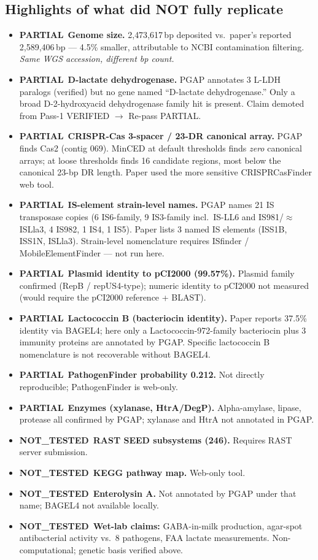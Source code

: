 \documentclass[11pt,letterpaper]{article}
\newcommand{\partialv}{\textcolor{orange!85!black}{\textbf{PARTIAL}}}
\newcommand{\nottested}{\textcolor{gray!70!black}{\textbf{NOT\_TESTED}}}
\begin{document}
\subsection{Highlights of what did NOT fully replicate}
\begin{itemize}[leftmargin=1.4em]
\item \partialv\ \textbf{Genome size.} 2{,}473{,}617\,bp deposited
vs.\ paper's reported 2{,}589{,}406\,bp --- 4.5\% smaller, attributable
to NCBI contamination filtering. \emph{Same WGS accession, different bp count.}
\item \partialv\ \textbf{D-lactate dehydrogenase.} PGAP annotates
3 L-LDH paralogs (verified) but no gene named ``D-lactate dehydrogenase.''
Only a broad D-2-hydroxyacid dehydrogenase family hit is present.
Claim demoted from Pass-1 VERIFIED $\rightarrow$ Re-pass PARTIAL.
\item \partialv\ \textbf{CRISPR-Cas 3-spacer / 23-DR canonical array.}
PGAP finds Cas2 (contig 069). MinCED at default thresholds finds
\emph{zero} canonical arrays; at loose thresholds finds 16 candidate
regions, most below the canonical 23-bp DR length. Paper used the more
sensitive CRISPRCasFinder web tool.
\item \partialv\ \textbf{IS-element strain-level names.} PGAP names
21 IS transposase copies (6 IS6-family, 9 IS3-family incl.\ IS-LL6 and
IS981/$\approx$ISLla3, 4 IS982, 1 IS4, 1 IS5). Paper lists 3 named
IS elements (ISS1B, ISS1N, ISLla3). Strain-level nomenclature requires
ISfinder / MobileElementFinder --- not run here.
\item \partialv\ \textbf{Plasmid identity to pCI2000 (99.57\%).}
Plasmid family confirmed (RepB / repUS4-type); numeric identity to
pCI2000 not measured (would require the pCI2000 reference + BLAST).
\item \partialv\ \textbf{Lactococcin B (bacteriocin identity).}
Paper reports 37.5\% identity via BAGEL4; here only a
Lactococcin-972-family bacteriocin plus 3 immunity proteins are
annotated by PGAP. Specific lactococcin B nomenclature is not
recoverable without BAGEL4.
\item \partialv\ \textbf{PathogenFinder probability 0.212.}
Not directly reproducible; PathogenFinder is web-only.
\item \partialv\ \textbf{Enzymes (xylanase, HtrA/DegP).}
Alpha-amylase, lipase, protease all confirmed by PGAP;
xylanase and HtrA not annotated in PGAP.
\item \nottested\ \textbf{RAST SEED subsystems (246).}
Requires RAST server submission.
\item \nottested\ \textbf{KEGG pathway map.} Web-only tool.
\item \nottested\ \textbf{Enterolysin A.} Not annotated by PGAP
under that name; BAGEL4 not available locally.
\item \nottested\ \textbf{Wet-lab claims:} GABA-in-milk production,
agar-spot antibacterial activity vs.\ 8 pathogens, FAA lactate
measurements. Non-computational; genetic basis verified above.
\end{itemize}
\end{document}
